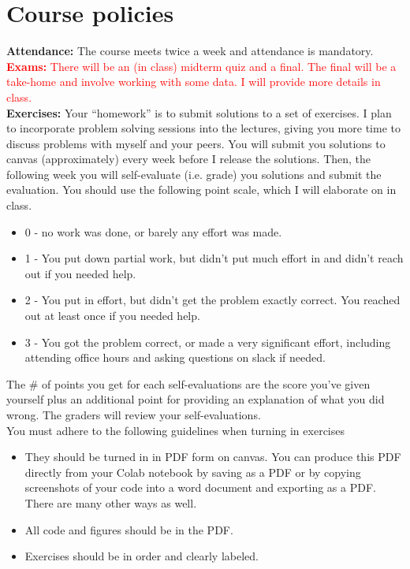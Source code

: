 \section*{Course policies}
\noindent
{\bf Attendance:} The course meets twice a week and attendance is mandatory.\\


\noindent
\textcolor{red}{{\bf Exams:} There will be an (in class) midterm quiz and a final. The final will be a take-home and involve working with some data. I will provide more details in class. } \\

\noindent
{\bf Exercises:}  Your “homework” is to submit solutions to a set of exercises.  I plan to incorporate problem solving sessions into the lectures, giving you more time to discuss problems with myself and your peers. You will submit you solutions to canvas (approximately) every week before I release the solutions. Then, the following week you will self-evaluate (i.e. grade) you solutions and submit the evaluation. You should use the following point scale, which I will elaborate on in class. 

\begin{itemize}
\item 0 - no work was done, or barely any effort was made.
\item 1 - You put down partial work, but didn't put much effort in and didn't reach out if you needed help.
\item 2 - You put in effort, but didn't get the problem exactly correct. You reached out at least once if you needed help.
\item 3 - You got the problem correct, or made a very significant effort, including attending office hours and asking questions on slack if needed.
\end{itemize}

The \# of points you get for each self-evaluations are the score you’ve given yourself plus an additional point for providing an explanation of what you did wrong. The graders will review your self-evaluations.\\

You must adhere to the following guidelines when turning in exercises
\begin{itemize}
\item They should be turned in in PDF form on canvas. You can produce this PDF directly from your Colab notebook by saving as a PDF or by copying screenshots of your code into a word document and exporting as a PDF. There are many other ways as well. 
\item All code and figures should be in the PDF. 
\item Exercises should be in order and clearly labeled. \\
\end{itemize}


